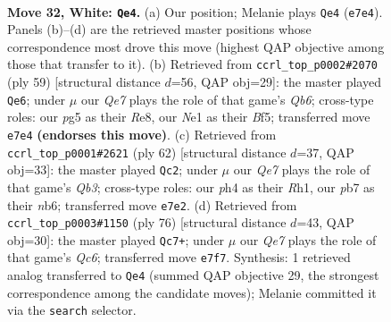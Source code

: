 \documentclass[11pt]{article}
\begin{document}
\clearpage

\begin{figure}[p]\centering
\begin{subfigure}{0.46\textwidth}\centering
\resizebox{\linewidth}{!}{%
\newchessgame
\chessboard[
  setfen={n1b4r/1p2Q3/7k/6p1/7p/P2P1P2/7K/4Nq2 w - - 2 32},
  showmover=false,
  pgfstyle=straightmove, color=movearrow, markmove={e7-e4}
]}
\caption{}
\end{subfigure}\hfill
\begin{subfigure}{0.46\textwidth}\centering
\resizebox{\linewidth}{!}{%
\newchessgame
\chessboard[
  setfen={4r1k1/5p2/5Q1p/p4b2/7P/1q4P1/5PB1/2R3K1 b - - 0 30},
  showmover=false,
  pgfstyle=straightmove, color=movearrow, markmove={b3-e6}
]}
\caption{}
\end{subfigure}
\\[4pt]
\begin{subfigure}{0.46\textwidth}\centering
\resizebox{\linewidth}{!}{%
\newchessgame
\chessboard[
  setfen={3r2k1/5p2/1n2p3/4P3/8/1Q3N2/1P2q1P1/1K5R w - - 2 32},
  showmover=false,
  pgfstyle=straightmove, color=movearrow, markmove={b3-c2}
]}
\caption{}
\end{subfigure}\hfill
\begin{subfigure}{0.46\textwidth}\centering
\resizebox{\linewidth}{!}{%
\newchessgame
\chessboard[
  setfen={8/k6p/2Qp4/3Pb3/2P5/1q2P3/2N4p/7K w - - 4 39},
  showmover=false,
  pgfstyle=straightmove, color=movearrow, markmove={c6-c7}
]}
\caption{}
\end{subfigure}
\caption{\textbf{Move 32, White: \texttt{Qe4}.} (a) Our position; Melanie plays \texttt{Qe4} (\texttt{e7e4}). Panels (b)--(d) are the retrieved master positions whose correspondence most drove this move (highest QAP objective among those that transfer to it). (b) Retrieved from \texttt{ccrl\_top\_p0002\#2070} (ply 59) [structural distance $d$=56, QAP obj=29]: the master played \texttt{Qe6}; under $\mu$ our \emph{Qe7} plays the role of that game's \emph{Qb6}; cross-type roles: our \emph{p}g5 as their \emph{R}e8, our \emph{N}e1 as their \emph{B}f5; transferred move \texttt{e7e4} \textbf{(endorses this move)}. (c) Retrieved from \texttt{ccrl\_top\_p0001\#2621} (ply 62) [structural distance $d$=37, QAP obj=33]: the master played \texttt{Qc2}; under $\mu$ our \emph{Qe7} plays the role of that game's \emph{Qb3}; cross-type roles: our \emph{p}h4 as their \emph{R}h1, our \emph{p}b7 as their \emph{n}b6; transferred move \texttt{e7e2}. (d) Retrieved from \texttt{ccrl\_top\_p0003\#1150} (ply 76) [structural distance $d$=43, QAP obj=30]: the master played \texttt{Qc7+}; under $\mu$ our \emph{Qe7} plays the role of that game's \emph{Qc6}; transferred move \texttt{e7f7}. Synthesis: 1 retrieved analog transferred to \texttt{Qe4} (summed QAP objective 29, the strongest correspondence among the candidate moves); Melanie committed it via the \texttt{search} selector.}
\label{fig:thought-m62}
\end{figure}
\end{document}
